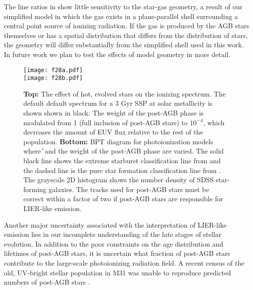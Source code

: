 The line ratios in  show little sensitivity to the star-gas geometry, a result of our simplified model in which the gas exists in a plane-parallel shell surrounding a central point source of ionizing radiation. If the gas is produced by the AGB stars themselves or has a spatial distribution that differs from the distribution of stars, the geometry will differ substantially from the simplified shell used in this work. In future work we plan to test the effects of model geometry in more detail. 

\begin{figure}[!htbp]
  \begin{centering}
    \texttt{[image: f28a.pdf]}\\
    \texttt{[image: f28b.pdf]}
    \caption{\textbf{Top:} The effect of hot, evolved stars on the ionizing spectrum. The default default spectrum for a 3 Gyr SSP at solar metallicity is shown shown in black. The weight of the post-AGB phase is modulated from 1 (full inclusion of post-AGB stars) to $10^{-4}$, which decreases the amount of EUV flux relative to the rest of the population. \textbf{Bottom:} BPT diagram for photoionization models where \U{} and the weight of the post-AGB phase are varied. The solid black line shows the extreme starburst classification line from \citet{Kewley01} and the dashed line is the pure star formation classification line from \citet{Kauffmann03a}. The grayscale 2D histogram shows the number density of SDSS star-forming galaxies. The \citet{Vassiliadis} tracks used for post-AGB stars must be correct within a factor of two if post-AGB stars are responsible for LIER-like emission.}
    \label{fig:hotstars}
  \end{centering}
\end{figure}

Another major uncertainty associated with the interpretation of LIER-like emission lies in our incomplete understanding of the late stages of stellar evolution. In addition to the poor constraints on the age distribution and lifetimes of post-AGB stars, it is uncertain what fraction of post-AGB stars contribute to the large-scale photoionizing radiation field. A recent census of the old, UV-bright stellar population in M31 was unable to reproduce predicted numbers of post-AGB stars \citep{Brown2008}. 

